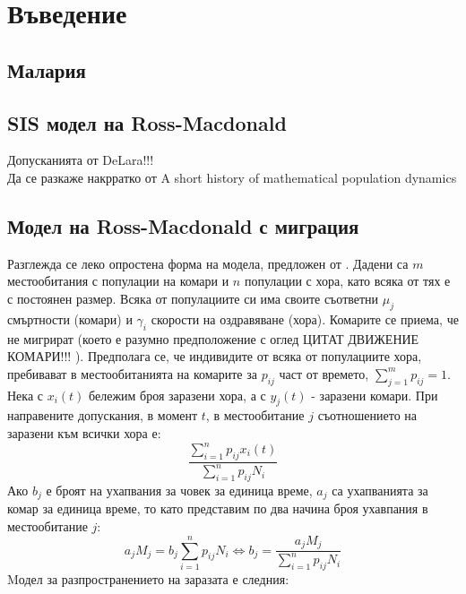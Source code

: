 \section{Въведение}
\subsection{Малария}
\subsection{SIS модел на Ross-Macdonald}
\color{Red} Допусканията от DeLara!!!
\color{Black} \\
\color{Red} Да се разкаже накрратко от A short history of mathematical population dynamics
\color{Black} \\

\subsection{Модел на Ross-Macdonald с миграция}
Разглежда се леко опростена форма на модела, предложен от \cite{Bichara2016}. Дадени са $m$ местообитания с популации на комари и $n$ популации с хора, като всяка от тях е с постоянен размер. Всяка от популациите си има своите съответни $\mu_j$ смъртности (комари) и $\gamma_i$ скорости на оздравяване (хора). Комарите се приема, че не мигрират (което е разумно предположение с оглед \color{Red} ЦИТАТ ДВИЖЕНИЕ КОМАРИ!!!
\color{Black}). Предполага се, че индивидите от всяка от популациите хора, пребивават в местообитанията на комарите за $p_{ij}$ част от времето, $\sum_{j=1}^m p_{ij} = 1$. \\
Нека с $x_i(t)$ бележим броя заразени хора, а с $y_j(t)$ - заразени комари. При направените допускания, в момент $t$, в местообитание $j$ съотношението на заразени към всички хора е:
\begin{equation}
  \frac{\sum_{i=1}^n p_{ij} x_i(t)}{\sum_{i=1}^n p_{ij} N_i}
\end{equation}
Ако $b_j$ е броят на ухапвания за човек за единица време, $a_j$ са ухапванията за комар за единица време, то като представим по два начина броя ухавпания в местообитание $j$:
\begin{equation}
  a_j M_j = b_j \sum_{i=1}^n p_{ij} N_i \iff b_j = \frac{a_j M_j}{\sum_{i=1}^n p_{ij} N_i}
\end{equation}
Mодел за разпространението на заразата е следния:
